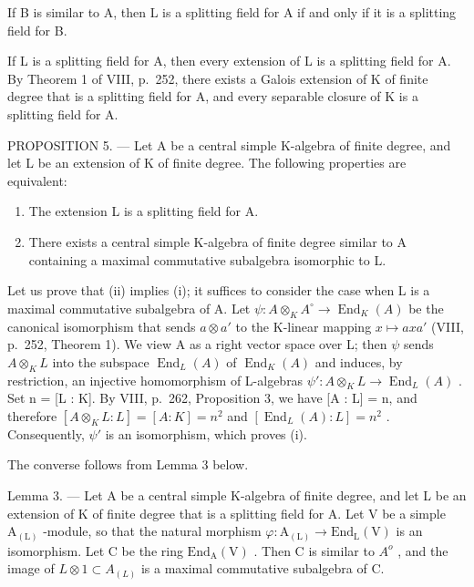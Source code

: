 If B is similar to A, then L is a splitting field for A if and only if it is a splitting field for B.

If L is a splitting field for A, then every extension of L is a splitting field for A. By Theorem 1 of VIII, p.~252, there exists a Galois extension of K of finite degree that is a splitting field for A, and every separable closure of K is a splitting field for A.

PROPOSITION 5. --- Let A be a central simple K-algebra of finite degree, and let L be an extension of K of finite degree. The following properties are equivalent:

\begin{enumerate}
\def\labelenumi{(\roman{enumi})}
\item
  The extension L is a splitting field for A.
\item
  There exists a central simple K-algebra of finite degree similar to A containing a maximal commutative subalgebra isomorphic to L.
\end{enumerate}

Let us prove that (ii) implies (i); it suffices to consider the case when L is a maximal commutative subalgebra of A. Let \(\psi: A \otimes_{K} A^{\circ} \to \operatorname{End}_{K}(A)\) be the canonical isomorphism that sends \(a \otimes a'\) to the K-linear mapping \(x \mapsto axa'\) (VIII, p.~252, Theorem 1). We view A as a right vector space over L; then \(\psi\) sends \(A \otimes_{K} L\) into the subspace \(\operatorname{End}_{L}(A)\) of \(\operatorname{End}_{K}(A)\) and induces, by restriction, an injective homomorphism of L-algebras \(\psi': A \otimes_{K} L \to \operatorname{End}_{L}(A)\) . Set n = {[}L : K{]}. By VIII, p.~262, Proposition 3, we have {[}A : L{]} = n, and therefore \([A \otimes_{K} L : L] = [A : K] = n^{2}\) and \([\operatorname{End}_{L}(A) : L] = n^{2}\) . Consequently, \(\psi'\) is an isomorphism, which proves (i).

The converse follows from Lemma 3 below.

Lemma 3. --- Let A be a central simple K-algebra of finite degree, and let L be an extension of K of finite degree that is a splitting field for A. Let V be a simple \(\mathrm{A}_{(\mathrm{L})}\) -module, so that the natural morphism \(\varphi: \mathrm{A}_{(\mathrm{L})} \to \mathrm{End}_{\mathrm{L}}(\mathrm{V})\) is an isomorphism. Let C be the ring \(\mathrm{End}_{\mathrm{A}}(\mathrm{V})\) . Then C is similar to \(A^{o}\) , and the image of \(L \otimes 1 \subset A_{(L)}\) is a maximal commutative subalgebra of C.

